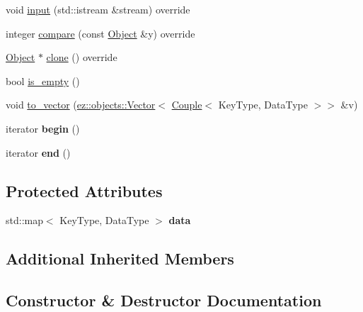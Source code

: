 \begin{DoxyCompactItemize}
void \hyperlink{classez_1_1objects_1_1Mapping_ad47e98279b853fd10614a24dc201d92e}{input} (std\+::istream \&stream) override
\item 
integer \hyperlink{classez_1_1objects_1_1Mapping_a7eb092099b5f47b101e5c54a46373ff0}{compare} (const \hyperlink{classez_1_1objects_1_1Object}{Object} \&y) override
\item 
\hyperlink{classez_1_1objects_1_1Object}{Object} $\ast$ \hyperlink{classez_1_1objects_1_1Mapping_aa8eb01c13630ff6ab44438e9a25aa019}{clone} () override
\item 
bool \hyperlink{classez_1_1objects_1_1Mapping_a8c7cf83ebf29a35ab146e1a1d0955907}{is\+\_\+empty} ()
\item 
void \hyperlink{classez_1_1objects_1_1Mapping_a7986873197eb0ab7199567f8c0ace175}{to\+\_\+vector} (\hyperlink{classez_1_1objects_1_1Vector}{ez\+::objects\+::\+Vector}$<$ \hyperlink{classez_1_1objects_1_1Couple}{Couple}$<$ Key\+Type, Data\+Type $>$$>$ \&v)
\item 
\mbox{\label{classez_1_1objects_1_1Mapping_a4a59e3a56359826f390771309116d077}} 
iterator {\bfseries begin} ()
\item 
\mbox{\label{classez_1_1objects_1_1Mapping_afe494ca1f8f80fbe796fa41f33608582}} 
iterator {\bfseries end} ()
\end{DoxyCompactItemize}
\subsection*{Protected Attributes}
\begin{DoxyCompactItemize}
\item 
\mbox{\label{classez_1_1objects_1_1Mapping_a5a842f943216955b68dc46605d93e1d7}} 
std\+::map$<$ Key\+Type, Data\+Type $>$ {\bfseries data}
\end{DoxyCompactItemize}
\subsection*{Additional Inherited Members}


\subsection{Constructor \& Destructor Documentation}
\mbox{\label{classez_1_1objects_1_1Mapping_a12a266ba49d22f9a382a4cc916253284}} 
